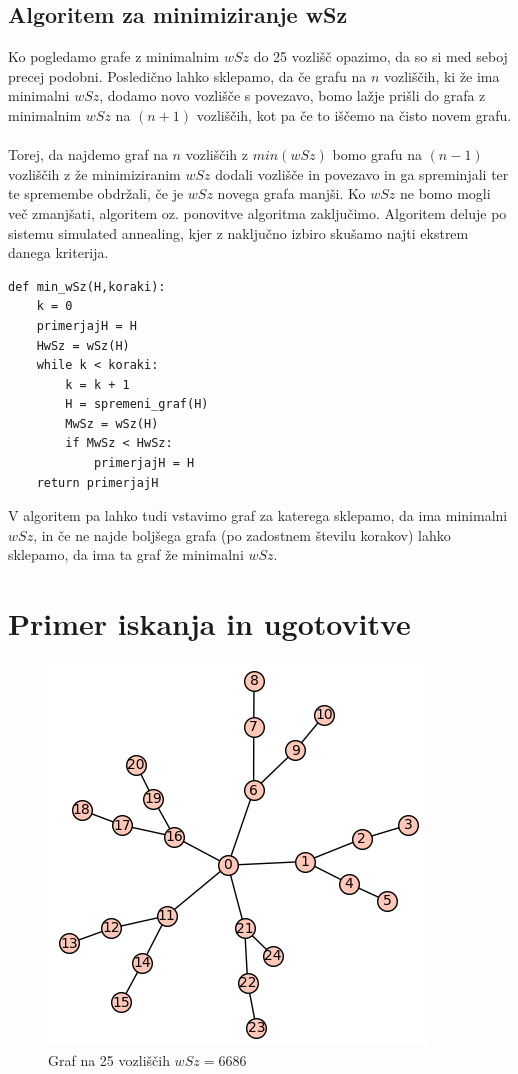 \documentclass[12pt, a4paper]{article}
\begin{document}
\newpage

\subsection[Algoritem za minimiziranje wSz]{Algoritem za minimiziranje wSz}

Ko pogledamo grafe z minimalnim $wSz$ do 25 vozlišč opazimo, da so si med seboj precej podobni. Posledično lahko sklepamo, da če grafu na $n$ vozliščih, ki že ima minimalni $wSz$, dodamo novo vozlišče s povezavo, bomo lažje prišli do grafa z minimalnim $wSz$ na $(n+1)$ vozliščih, kot pa če to iščemo na čisto novem grafu.\\
\\
Torej, da najdemo graf na $n$ vozliščih z $min(wSz)$ bomo grafu na $(n-1)$ vozliščih z že minimiziranim $wSz$ dodali vozlišče in povezavo in ga spreminjali ter te spremembe obdržali, če je $wSz$ novega grafa manjši. Ko $wSz$ ne bomo mogli več zmanjšati, algoritem oz. ponovitve algoritma zaključimo. Algoritem deluje po sistemu simulated annealing, kjer z naključno izbiro skušamo najti ekstrem danega kriterija.

\begin{verbatim}
def min_wSz(H,koraki):
    k = 0
    primerjajH = H
    HwSz = wSz(H)
    while k < koraki:
        k = k + 1
        H = spremeni_graf(H)
        MwSz = wSz(H)
        if MwSz < HwSz:
            primerjajH = H
    return primerjajH
\end{verbatim}

V algoritem pa lahko tudi vstavimo graf za katerega sklepamo, da ima minimalni $wSz$, in če ne najde boljšega grafa (po zadostnem številu korakov)  lahko sklepamo, da ima ta graf že minimalni $wSz$.

\newpage

\section[Primer iskanja in ugotovitve]{Primer iskanja in ugotovitve}

\begin{figure}[h]
\centering
\includegraphics[scale=0.4]{koncni_graf25}
\caption{Graf na 25 vozliščih $wSz = 6686$}
\end{figure}
\end{document}
